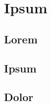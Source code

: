 
\chapter{Ipsum}
\label{cap:ipsum}

\lipsum[1]

\section{Lorem}
\lipsum[2]

\section{Ipsum}
\lipsum[3]

\section{Dolor}
\lipsum[4-5]